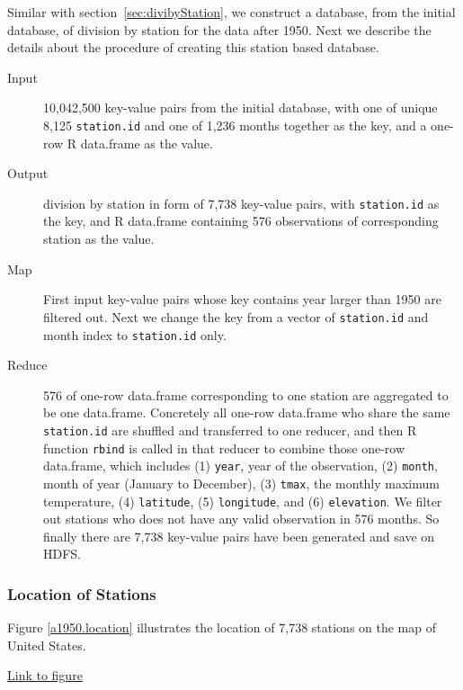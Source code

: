 Similar with section~\ref{sec:divibyStation}, we construct a database, from the
initial database, of division by station for the data after 1950. Next we 
describe the details about the procedure of creating this station based database.

\begin{description}
  \item[Input] 10,042,500 key-value pairs from the initial database, with one of
  unique 8,125 \texttt{station.id} and one of 1,236 months together as the key, 
  and a one-row R data.frame as the value. 
  \item[Output] division by station in form of 7,738 key-value pairs, with 
  \texttt{station.id} as the key, and R data.frame containing 576 observations 
  of corresponding station as the value.
  \item[Map]First input key-value pairs whose key contains year larger than 1950
  are filtered out. Next we change the key from a vector of \texttt{station.id} 
  and month index to \texttt{station.id} only. 
  \item[Reduce] 576 of one-row data.frame corresponding to one station are 
  aggregated to be one data.frame. Concretely all one-row data.frame who share
  the same \texttt{station.id} are shuffled and transferred to one reducer, and 
  then R function \texttt{rbind} is called in that reducer to combine those one-row 
  data.frame, which includes (1) \texttt{year}, year of the observation, 
  (2) \texttt{month}, month of year (January to December), (3) \texttt{tmax}, 
  the monthly maximum temperature, (4) \texttt{latitude}, (5) \texttt{longitude}, 
  and (6) \texttt{elevation}. We filter out stations who does not have any valid
  observation in 576 months. So finally there are 7,738 key-value pairs have been
  generated and save on HDFS. 
\end{description}

\subsubsection{Location of Stations}

Figure \href{../plots/a1950stations.pdf}{\ref*{a1950.location}} illustrates the 
location of 7,738 stations on the map of United States.

\begin{framed}
\begin{center}
  \href{../plots/a1950stations.pdf}{Link to figure}
  \label{a1950.location}
\end{center}
\end{framed}

